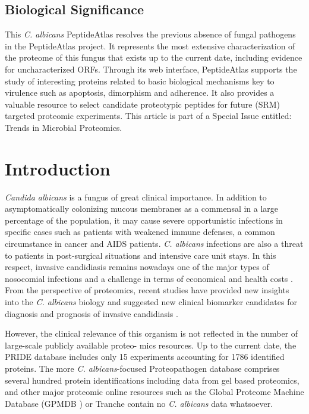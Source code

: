 \subsection*{Biological Significance}
This \textit{C. albicans} PeptideAtlas resolves the previous absence of fungal 
pathogens in the PeptideAtlas project. It represents the most extensive
characterization of the proteome of this fungus that exists up to the 
current date, including evidence for uncharacterized ORFs. Through its 
web interface, PeptideAtlas supports the study of interesting proteins 
related to basic biological mechanisms key to virulence such as 
apoptosis, dimorphism and adherence. It also provides a valuable 
resource to select candidate proteotypic peptides for future (SRM) 
targeted proteomic experiments. 
This article is part of a Special Issue entitled: Trends in Microbial Proteomics.

\newpage


\section*{Introduction}

\textit{Candida albicans} is a fungus of great clinical importance. In
addition to asymptomatically colonizing mucous membranes
as a commensal in a large percentage of the population, it
may cause severe opportunistic infections in specific cases
such as patients with weakened immune defenses, a common
circumstance in cancer and AIDS patients. \textit{C. albicans} infections
are also a threat to patients in post-surgical situations and
intensive care unit stays. In this respect, invasive candidiasis
remains nowadays one of the major types of nosocomial
infections and a challenge in terms of economical and health
costs \citep{Wisplinghoff2004, Moran2010, Tong2008}.
From the perspective of proteomics, recent studies
have provided new insights into the \textit{C. albicans} biology and
suggested new clinical biomarker candidates for diagnosis and
prognosis of invasive candidiasis \citep{Pitarch2006, Pitarch2006a,
Fernandez-Arenas2007, Pitarch2011}.

However, the clinical relevance of this organism is not
reflected in the number of large-scale publicly available proteo-
mics resources. Up to the current date, the PRIDE \citep{Vizcaino2013} database
includes only 15 experiments accounting for 1786 identified
proteins. The more \textit{C. albicans}-focused Proteopathogen database
\citep{Vialas2009b} comprises several hundred protein identifications including
data from gel based proteomics, and other major proteomic
online resources such as the Global Proteome Machine Database 
(GPMDB \citep{Craig2004}) or Tranche \citep{Smith2011} contain no \textit{C. albicans} data
whatsoever.

